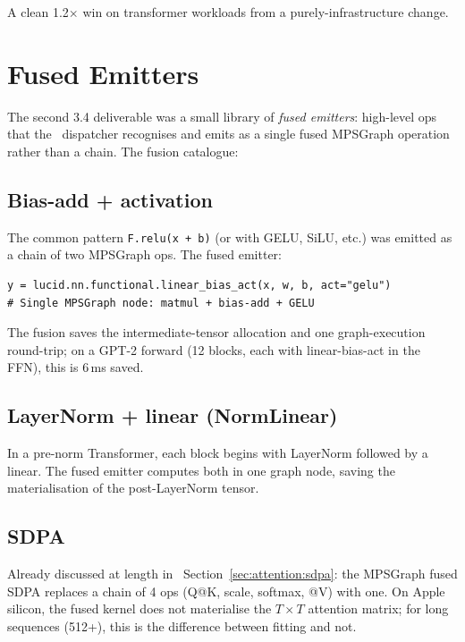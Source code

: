 A clean 1.2$\times$ win on transformer workloads from a
purely-infrastructure change.

\section{Fused Emitters}
\label{sec:mpsgraph_dispatch:fused_emitters}

The second 3.4 deliverable was a small library of
\emph{fused emitters}: high-level ops that the \Lucid\
dispatcher recognises and emits as a single fused MPSGraph
operation rather than a chain. The fusion catalogue:

\subsection{Bias-add + activation}
\label{ssec:mpsgraph_dispatch:bias_act}

The common pattern \texttt{F.relu(x + b)} (or with GELU, SiLU,
etc.) was emitted as a chain of two MPSGraph ops. The fused
emitter:

\begin{lstlisting}[style=lucid,language=LucidPython]
y = lucid.nn.functional.linear_bias_act(x, w, b, act="gelu")
# Single MPSGraph node: matmul + bias-add + GELU
\end{lstlisting}

The fusion saves the intermediate-tensor allocation and one
graph-execution round-trip; on a GPT-2 forward (12 blocks,
each with linear-bias-act in the FFN), this is 6\,ms saved.

\subsection{LayerNorm + linear (NormLinear)}
\label{ssec:mpsgraph_dispatch:norm_linear}

In a pre-norm Transformer, each block begins with LayerNorm
followed by a linear. The fused emitter computes both in one
graph node, saving the materialisation of the
post-LayerNorm tensor.

\subsection{SDPA}
\label{ssec:mpsgraph_dispatch:sdpa}

Already discussed at length in
~Section~\ref{sec:attention:sdpa}: the
MPSGraph fused SDPA replaces a chain of 4 ops (Q@K, scale,
softmax, @V) with one. On Apple silicon, the fused kernel does
not materialise the $T \times T$ attention matrix; for long
sequences (512+), this is the difference between fitting and
not.

